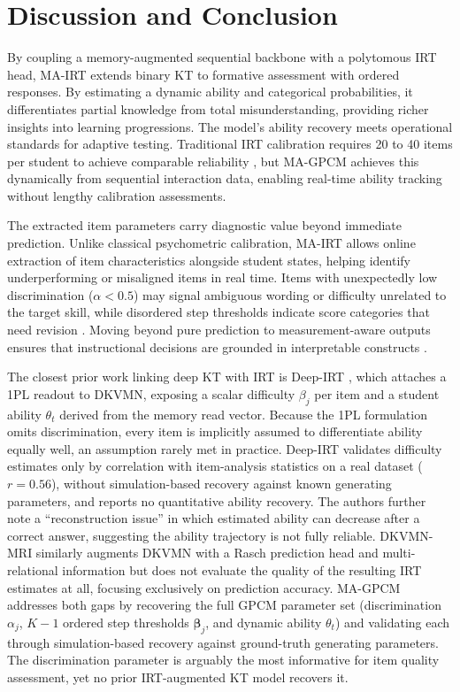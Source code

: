 \documentclass[pdflatex,sn-apa]{sn-jnl}
\begin{document}
\section{Discussion and Conclusion}
\label{sec:discussion}

By coupling a memory-augmented sequential backbone with a polytomous IRT head, MA-IRT extends binary KT to formative assessment with ordered responses. By estimating a dynamic ability and categorical probabilities, it differentiates partial knowledge from total misunderstanding, providing richer insights into learning progressions. The model's ability recovery meets operational standards for adaptive testing. Traditional IRT calibration requires 20 to 40 items per student to achieve comparable reliability \citep{de_ayala_theory_2009}, but MA-GPCM achieves this dynamically from sequential interaction data, enabling real-time ability tracking without lengthy calibration assessments.

The extracted item parameters carry diagnostic value beyond immediate prediction. Unlike classical psychometric calibration, MA-IRT allows online extraction of item characteristics alongside student states, helping identify underperforming or misaligned items in real time. Items with unexpectedly low discrimination ($\alpha < 0.5$) may signal ambiguous wording or difficulty unrelated to the target skill, while disordered step thresholds indicate score categories that need revision \citep{wilson_constructing_2005}. Moving beyond pure prediction to measurement-aware outputs ensures that instructional decisions are grounded in interpretable constructs \citep{heritage_formative_2007}.

The closest prior work linking deep KT with IRT is Deep-IRT \citep{yeung_deep-irt_2019}, which attaches a 1PL readout to DKVMN, exposing a scalar difficulty $\beta_j$ per item and a student ability $\theta_t$ derived from the memory read vector. Because the 1PL formulation omits discrimination, every item is implicitly assumed to differentiate ability equally well, an assumption rarely met in practice. Deep-IRT validates difficulty estimates only by correlation with item-analysis statistics on a real dataset ($r = 0.56$), without simulation-based recovery against known generating parameters, and reports no quantitative ability recovery. The authors further note a ``reconstruction issue'' in which estimated ability can decrease after a correct answer, suggesting the ability trajectory is not fully reliable. DKVMN-MRI \citep{xu_dkvmn_2024} similarly augments DKVMN with a Rasch prediction head and multi-relational information but does not evaluate the quality of the resulting IRT estimates at all, focusing exclusively on prediction accuracy. MA-GPCM addresses both gaps by recovering the full GPCM parameter set (discrimination $\alpha_j$, $K{-}1$ ordered step thresholds $\boldsymbol{\beta}_j$, and dynamic ability $\theta_t$) and validating each through simulation-based recovery against ground-truth generating parameters. The discrimination parameter is arguably the most informative for item quality assessment, yet no prior IRT-augmented KT model recovers it.
\end{document}
